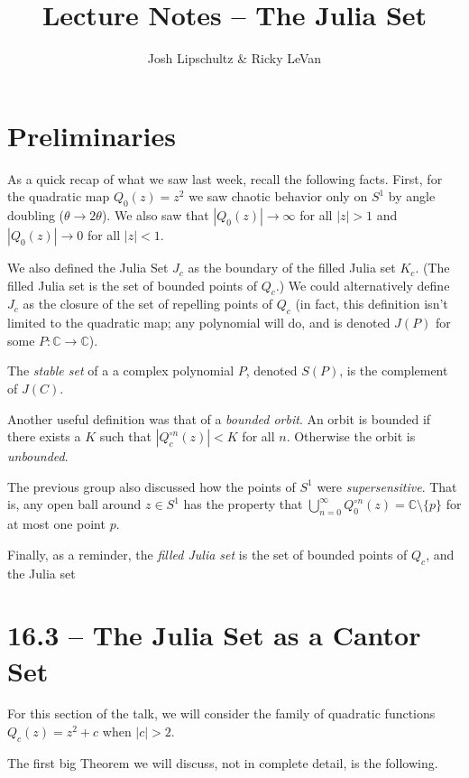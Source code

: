 \documentclass[symmetric]{tufte-handout}
\title{Lecture Notes -- The Julia Set}
\author{Josh Lipschultz \& Ricky LeVan}
\date{}  %
\begin{document}
\maketitle%

\section{Preliminaries}\label{sec:problem-1}

As a quick recap of what we saw last week, recall the following facts.
First, for the quadratic map $Q_0(z) = z^2$ we saw chaotic behavior only on $S^1$ by angle doubling ($\theta \rightarrow 2\theta$). We also saw that $|Q_0(z)| \rightarrow \infty$ for all $|z| > 1$ and $|Q_0(z)| \rightarrow 0$ for all $|z| < 1$.

We also defined the Julia Set $J_c$ as the boundary of the filled Julia set $K_c$. (The filled Julia set is the set of bounded points of $Q_c$.) We could alternatively define $J_c$ as the closure of the set of repelling points of $Q_c$ (in fact, this definition isn't limited to the quadratic map; any polynomial will do, and is denoted $J(P)$ for some $P: \mathbb{C} \rightarrow \mathbb{C}$).

The \textsl{stable set} of a a complex polynomial $P$, denoted $S(P)$, is the complement of $J(C)$.

Another useful definition was that of a \textsl{bounded orbit}. An orbit is bounded if there exists a $K$ such that $|Q_c^{\circ n}(z)| < K$ for all $n$. Otherwise the orbit is \textsl{unbounded}.

The previous group also discussed how the points of $S^1$ were \textsl{supersensitive}. That is, any open ball around $z \in S^1$ has the property that $\bigcup_{n=0}^\infty Q_0^{\circ n} (z) = \mathbb{C} \setminus \{p\}$ for at most one point $p$.

Finally, as a reminder, the \textsl{filled Julia set} is the set of bounded points of $Q_c$, and the Julia set

\section{16.3 -- The Julia Set as a Cantor Set}\label{sec:problem-1}

For this section of the talk, we will consider the family of quadratic functions 
$Q_c(z) = z^2 +c$ when $|c|>2$. 

The first big Theorem we will discuss, not in complete detail, is the following.
\end{document}
